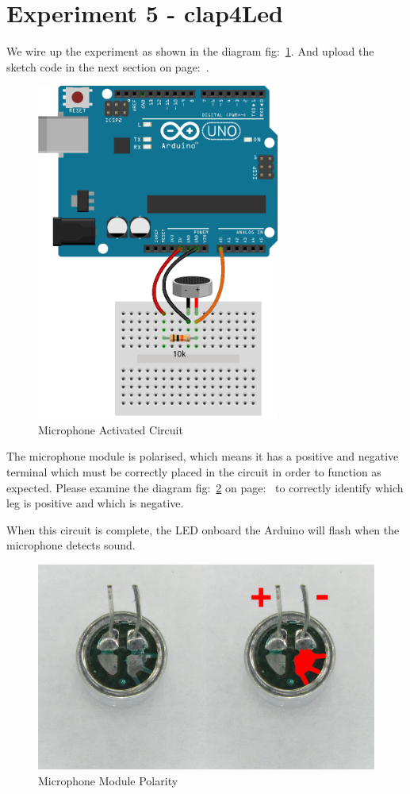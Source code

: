 \chapter*{Experiment 5 - clap4Led}
We wire up the experiment as shown in the diagram fig:~\ref{fig:exp5_microphone}. And upload the sketch code in the next section on page:~\pageref{sketch:exp5}.

%
\begin{figure}[ht]
	\centering
	\includegraphics[width=8cm]{images/21}
	\caption{Microphone Activated Circuit}
	\label{fig:exp5_microphone}
\end{figure}
%

The microphone module is polarised, which means it has a positive and negative terminal which must be correctly placed in the circuit in order to function as expected. Please examine the diagram fig:~\ref{fig:exp5_microphone_polarity} on page:~\pageref{fig:exp5_microphone_polarity} to correctly identify which leg is positive and which is negative.

When this circuit is complete, the LED onboard the Arduino will flash when the microphone detects sound.

%
\begin{figure}[ht]
	\centering
	\includegraphics[width=12cm]{images/22}
	\caption{Microphone Module Polarity}
	\label{fig:exp5_microphone_polarity}
\end{figure}
%


